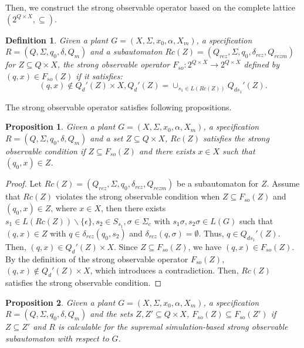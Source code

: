 \documentclass[12pt,draftcls,onecolumn]{IEEEtran}
\newtheorem{Proposition}{Proposition}
\newtheorem{Definition}{Definition}
\begin{document}
Then, we construct the strong observable operator based on the
complete lattice $(2^{Q \times X}, \subseteq)$.
\begin{Definition}
Given a plant $G =(X,\Sigma,x_{0},\alpha,X_{m})$, a specification
$R =(Q,\Sigma,q_{0},\delta,Q_{m})$ and a subautomaton $Rc(Z)
=(Q_{rcz},\Sigma,q_{0},\delta_{rcz},Q_{rczm})$ for $Z \subseteq Q
\times X$, the strong observable operator $F_{so}: 2^{Q \times X}
\rightarrow 2^{Q \times X}$ defined by $(q, x) \in F_{so}(Z)$ if
it satisfies:
\[
(q, x)\notin Q_d'(Z) \times X, Q_d'(Z) = \cup_{s_1 \in
L(Rc(Z))}Q_{ds_1}'(Z).
\]
\end{Definition}

The strong observable operator satisfies following propositions.

\begin{Proposition}\label{ns}
Given a plant $G =(X,\Sigma,x_{0},\alpha,X_{m})$, a specification
$R =(Q,\Sigma,q_{0},\delta,Q_{m})$ and a set $Z \subseteq Q \times
X$, $Rc(Z)$ satisfies the strong observable condition if $Z
\subseteq F_{so}(Z)$ and there exists $x \in X$ such that $(q_0,
x) \in Z$.
\end{Proposition}


\begin{proof}
Let $Rc(Z)=(Q_{rcz},\Sigma,q_{0},\delta_{rcz},Q_{rczm})$ be a
subautomaton for $Z$. Assume that $Rc(Z)$ violates the strong
observable condition when $Z \subseteq F_{so}(Z)$ and $(q_0, x)
\in Z$, where $x \in X$, then there exists $s_1 \in L(Rc(Z))
\backslash \{\epsilon\}, s_2 \in S_{s_1}, \sigma \in \Sigma_{c}$
with $s_1\sigma, s_2\sigma \in L(G)$ such that $(q, x) \in Z$ with
$q \in \delta_{rcz}(q_0, s_2)$ and $\delta_{rcz}(q, \sigma) =
\emptyset$. Thus, $q \in Q_{ds_1}'(Z)$. Then, $(q, x) \in
Q_{d}'(Z) \times X$. Since $Z \subseteq F_{so}(Z)$, we have $(q,
x) \in F_{so}(Z)$. By the definition of the strong observable
operator $F_{so}(Z)$, $(q, x) \notin Q_{d}'(Z) \times X$, which
introduces a contradiction. Then, $Rc(Z)$ satisfies the strong
observable condition.
\end{proof}

\begin{Proposition}\label{nm}
Given a plant $G =(X,\Sigma,x_{0},\alpha,X_{m})$, a specification $R
=(Q,\Sigma,q_{0},\delta,Q_{m})$ and the sets $Z, Z' \subseteq Q
\times X$, $F_{so}(Z) \subseteq F_{so}(Z')$ if $Z \subseteq Z'$ and
$R$ is calculable for the supremal simulation-based strong
observable subautomaton with respect to $G$.
\end{Proposition}
\end{document}
